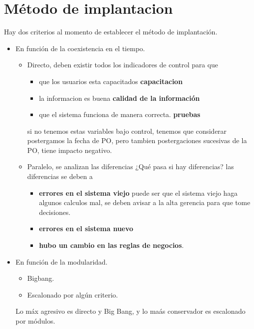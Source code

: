 \documentclass[12pt]{book}
\begin{document}
\section{Método de implantacion}
Hay dos criterios al momento de establecer el método de implantación.
\begin{itemize}
    \item En función de la coexistencia en el tiempo.
    \begin{itemize}
        \item Directo, deben existir todos los indicadores de control para que 
            \begin{itemize}
                \item que los usuarios esta capacitados \textbf{capacitacion}
                \item la informacion es buena \textbf{calidad de la información}
                \item que el sistema funciona de manera correcta. \textbf{pruebas}
            \end{itemize}
            si no tenemos estas variables bajo control, tenemos que considerar postergamos la fecha de PO, pero tambien postergaciones sucesivas
            de la PO, tiene impacto negativo.
        \item Paralelo, se analizan las diferencias ¿Qué pasa si hay diferencias?
                las diferencias se deben a 
                \begin{itemize}
                    \item \textbf{errores en el sistema viejo} puede ser que el sistema viejo haga algunos calculos mal, se deben avisar a la alta gerencia para que tome decisiones.
                    \item \textbf{errores en el sistema nuevo}
                    \item \textbf{hubo un cambio en las reglas de negocios}.
                \end{itemize}
        
    \end{itemize}
    \item En función de la modularidad.
    \begin{itemize}
        \item Bigbang.
        \item Escalonado por algún criterio.
    \end{itemize}
    Lo máx agresivo es directo y Big Bang, y lo maás conservador es escalonado por módulos.
\end{itemize}
\end{document}
